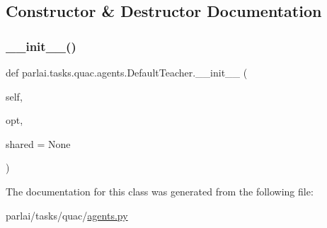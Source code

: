\subsection{Constructor \& Destructor Documentation}
\mbox{\label{classparlai_1_1tasks_1_1quac_1_1agents_1_1DefaultTeacher_a45c9f1c71c4c5c93e7fe32685a8fd4e9}} 
\subsubsection{\texorpdfstring{\+\_\+\+\_\+init\+\_\+\+\_\+()}{\_\_init\_\_()}}
{\footnotesize\ttfamily def parlai.\+tasks.\+quac.\+agents.\+Default\+Teacher.\+\_\+\+\_\+init\+\_\+\+\_\+ (\begin{DoxyParamCaption}\item[{}]{self,  }\item[{}]{opt,  }\item[{}]{shared = {\ttfamily None} }\end{DoxyParamCaption})}



The documentation for this class was generated from the following file\+:\begin{DoxyCompactItemize}
\item 
parlai/tasks/quac/\hyperlink{parlai_2tasks_2quac_2agents_8py}{agents.\+py}\end{DoxyCompactItemize}
